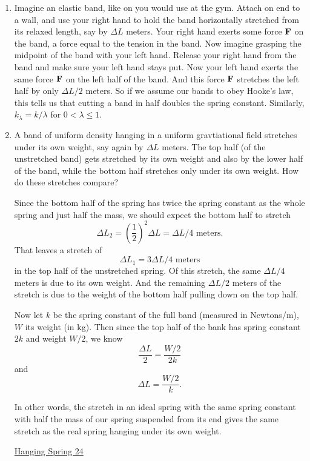 \documentclass{ximera}
\begin{document}
\begin{enumerate}
\item Imagine an elastic band, like on you would use at the gym. Attach on end to a wall, and use your right hand to hold the band horizontally stretched from its relaxed length, say by $\Delta L$ meters. Your right hand exerts some force ${\bf F}$ on the band, a force equal to the tension in the band. Now imagine grasping the midpoint of the band with your left hand. Release your right hand from the band and make sure your left hand stays put. Now your left hand exerts the same force ${\bf F}$ on the left half of the band. And this force ${\bf F}$ stretches the left half by only $\Delta L/2$ meters. So if we assume our bands to obey Hooke's law, this tells us that cutting a band in half doubles the spring constant. Similarly, $k_\lambda = k / \lambda$ for $0< \lambda \leq 1$.

\item A band of uniform density hanging in a uniform gravtiational field stretches under its own weight, say again by $\Delta L$ meters. The top half (of the unstretched band) gets stretched by its own weight and also by the lower half of the band, while the bottom half stretches only under its own weight. How do these stretches compare?

Since the bottom half of the spring has twice the spring constant as the whole spring and just half the mass, we should expect the bottom half to stretch 
\[
    \Delta L_2 =  \left(  \frac{1}{2}\right)^2 \Delta L = \Delta L/4 \text{ meters}. 
\]
That leaves a stretch of 
\[
 \Delta L_1 = 3\Delta L / 4 \text{ meters}
\]
in the top half of the unstretched spring. Of this stretch, the same $\Delta L/4$ meters is due to its own weight. And the remaining $\Delta L/2$ meters of the stretch is due to the weight of the bottom half pulling down on the top half.

Now let $k$ be the spring constant of the full band (measured in Newtons/m), $W$ its weight (in kg). Then since the top half of the bank has spring constant $2k$ and weight $W/2$, we know
\[
  \frac{\Delta L}{2} = \frac{W/2}{2k}
\] 
and
\[
   \Delta L =  \frac{W/2}{k} .
\]

In other words, the stretch in an ideal spring with the same spring constant with half the mass of our spring suspended from its end gives the same stretch as the real spring hanging under its own weight.


\begin{onlineOnly}
    \begin{center}
\end{center}
\end{onlineOnly}

\href{https://www.desmos.com/calculator/7kykohyoic}{Hanging Spring 24}


\end{enumerate}
\end{document}

